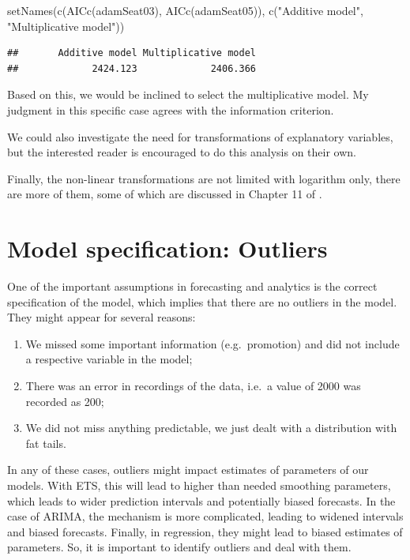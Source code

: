 \documentclass[
]{book}
\newenvironment{Shaded}{\begin{snugshade}}{\end{snugshade}}
\newcommand{\FunctionTok}[1]{\textcolor[rgb]{0.00,0.00,0.00}{#1}}
\newcommand{\NormalTok}[1]{#1}
\newcommand{\StringTok}[1]{\textcolor[rgb]{0.31,0.60,0.02}{#1}}
\providecommand{\tightlist}{%
  \setlength{\itemsep}{0pt}\setlength{\parskip}{0pt}}
\theoremstyle{definition}
\theoremstyle{definition}
\theoremstyle{definition}
\theoremstyle{definition}
\theoremstyle{remark}
\begin{document}
\begin{Shaded}
\begin{Highlighting}[]
\FunctionTok{setNames}\NormalTok{(}\FunctionTok{c}\NormalTok{(}\FunctionTok{AICc}\NormalTok{(adamSeat03), }\FunctionTok{AICc}\NormalTok{(adamSeat05)),}
         \FunctionTok{c}\NormalTok{(}\StringTok{"Additive model"}\NormalTok{, }\StringTok{"Multiplicative model"}\NormalTok{))}
\end{Highlighting}
\end{Shaded}

\begin{verbatim}
##       Additive model Multiplicative model 
##             2424.123             2406.366
\end{verbatim}

Based on this, we would be inclined to select the multiplicative model. My judgment in this specific case agrees with the information criterion.

We could also investigate the need for transformations of explanatory variables, but the interested reader is encouraged to do this analysis on their own.

Finally, the non-linear transformations are not limited with logarithm only, there are more of them, some of which are discussed in Chapter 11 of \citet{SvetunkovSBA}.

\hypertarget{diagnosticsOutliers}{%
\section{Model specification: Outliers}\label{diagnosticsOutliers}}

One of the important assumptions in forecasting and analytics is the correct specification of the model, which implies that there are no outliers in the model. They might appear for several reasons:

\begin{enumerate}
\def\labelenumi{\arabic{enumi}.}
\tightlist
\item
  We missed some important information (e.g.~promotion) and did not include a respective variable in the model;
\item
  There was an error in recordings of the data, i.e.~a value of 2000 was recorded as 200;
\item
  We did not miss anything predictable, we just dealt with a distribution with fat tails.
\end{enumerate}

In any of these cases, outliers might impact estimates of parameters of our models. With ETS, this will lead to higher than needed smoothing parameters, which leads to wider prediction intervals and potentially biased forecasts. In the case of ARIMA, the mechanism is more complicated, leading to widened intervals and biased forecasts. Finally, in regression, they might lead to biased estimates of parameters. So, it is important to identify outliers and deal with them.
\end{document}
